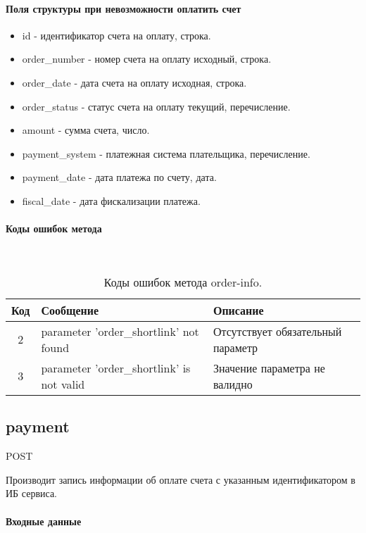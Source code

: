 \documentclass[11pt, a4paper]{article}
\begin{document}
\paragraph{Поля структуры при невозможности оплатить счет}

\begin{itemize}
	\item id - идентификатор счета на оплату, строка.
	\item order\_number - номер счета на оплату исходный, строка.
	\item order\_date - дата счета на оплату исходная, строка.
	\item order\_status - статус счета на оплату текущий, перечисление.
	\item amount - сумма счета, число.
	\item payment\_system - платежная система плательщика, перечисление.
	\item payment\_date - дата платежа по счету, дата.
	\item fiscal\_date - дата фискализации платежа.
\end{itemize}

\paragraph{Коды ошибок метода}\

\begin{table}[H]
	\centering
	
	\begin{tabular}{| c | p{7cm} | p{8cm} |}
		\hline
		Код & Сообщение & Описание \\
		\hline
		2 & parameter 'order\_shortlink' not found & Отсутствует обязательный параметр \\
		3 & parameter 'order\_shortlink' is not valid & Значение параметра не валидно \\
		\hline
	\end{tabular}
	\caption{Коды ошибок метода order-info.}
\end{table}

\subsection{payment}
POST

Производит запись информации об оплате счета с указанным идентификатором в ИБ сервиса.

\paragraph{Входные данные}\
\end{document}
